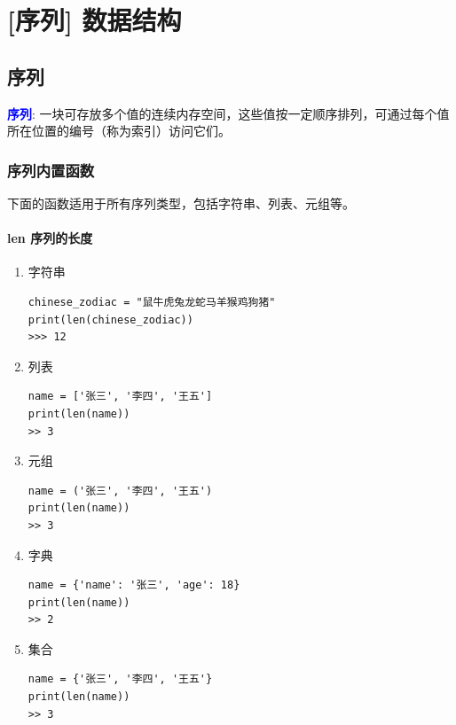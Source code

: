 \chapter{[序列] 数据结构}
\section{序列}
\textcolor{blue}{\textbf{序列}}: 一块可存放多个值的连续内存空间，这些值按一定顺序排列，可通过每个值所在位置的编号（称为索引）访问它们。

\subsection{序列内置函数}
下面的函数适用于所有序列类型，包括字符串、列表、元组等。

\subsubsection{len 序列的长度}

\begin{enumerate}[label=\arabic*)]
    \item 字符串
\begin{lstlisting}[style=demostyle,numbers=none]
chinese_zodiac = "鼠牛虎兔龙蛇马羊猴鸡狗猪"
print(len(chinese_zodiac))
>>> 12
\end{lstlisting}

    \item 列表
\begin{lstlisting}[style=demostyle,numbers=none]
name = ['张三', '李四', '王五']
print(len(name))
>> 3
\end{lstlisting}

    \item 元组
\begin{lstlisting}[style=demostyle,numbers=none]
name = ('张三', '李四', '王五')
print(len(name))
>> 3
\end{lstlisting}

    \item 字典
\begin{lstlisting}[style=demostyle,numbers=none]
name = {'name': '张三', 'age': 18}
print(len(name))
>> 2
\end{lstlisting}

    \item 集合
\begin{lstlisting}[style=demostyle,numbers=none]
name = {'张三', '李四', '王五'}
print(len(name))
>> 3
\end{lstlisting}
\end{enumerate}


